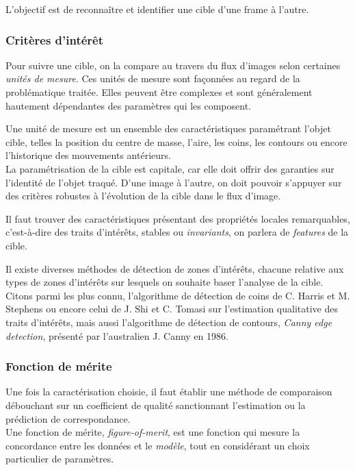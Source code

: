 \documentclass[a4paper,12pt]{report}
\begin{document}
L'objectif est de reconnaître et identifier une cible d'une frame à l'autre. 

\subsubsection{Critères d'intérêt}
Pour suivre une cible, on la compare au travers du flux d'images selon certaines \textit{unités de mesure}.
Ces unités de mesure sont façonnées au regard de la problématique traitée. Elles peuvent \^etre complexes et sont généralement hautement dépendantes des paramètres qui les composent.

Une unité de mesure est un ensemble des caractéristiques paramétrant l'objet cible, telles la position du centre de masse, l'aire, les coins, les contours ou encore l'historique des mouvements antérieurs. \\

La paramétrisation de la cible est capitale, car elle doit offrir des garanties sur l'identité de l'objet traqué. 
D'une image à l'autre, on doit pouvoir s'appuyer sur des critères robustes à l'évolution de la cible dans le flux d'image.


Il faut trouver des caractéristiques présentant des propriétés locales remarquables, c'est-à-dire des traits d'intérêts, stables ou \textit{invariants}, on parlera de \textit{features} de la cible.

Il existe diverses méthodes de détection de zones d'intérêts, chacune relative aux types de zones d'intérêts sur lesquels on souhaite baser l'analyse de la cible. Citons parmi les plus connu, l'algorithme de détection de coins de C. Harris et M. Stephens ou encore celui de J. Shi et C. Tomasi sur l'estimation qualitative des traits d'intérêts, mais aussi l'algorithme de détection de contours, \textit{Canny edge detection}, présenté par l'australien J. Canny en 1986.

\subsubsection{Fonction de mérite}
Une fois la caractérisation choisie, il faut établir une méthode de comparaison débouchant sur un coefficient de qualité sanctionnant l'estimation ou la prédiction de correspondance.\\

Une fonction de mérite, \textit{figure-of-merit}, est une fonction qui mesure la concordance entre les données et le \textit{modèle}, tout en considérant un choix particulier de paramètres.\\
\end{document}
